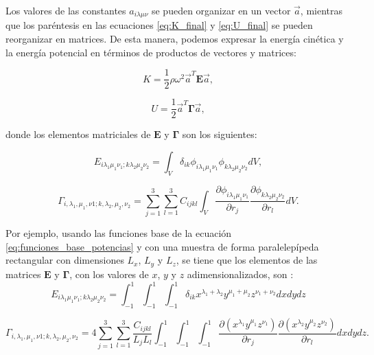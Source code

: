 \documentclass[12pt]{article}
\begin{document}
Los valores de las constantes $a_{i \lambda \mu \nu}$ se pueden organizar en un vector $\vec{a}$, mientras que los paréntesis en las ecuaciones \ref{eq:K_final} y \ref{eq:U_final} se pueden reorganizar en matrices. De esta manera, podemos expresar la energía cinética y la energía potencial en términos de productos de vectores y matrices: 

\begin{equation}
	K = \frac{1}{2} \rho \omega^2 \vec{a}^{T}\bm{E}\vec{a},
	\label{eq:K_matrix}
\end{equation}

\begin{equation}
	U = \frac{1}{2} \vec{a}^{T}\bm{\Gamma}\vec{a},
\end{equation}

donde los elementos matriciales de $\bm{E}$ y $\bm{\Gamma}$ son los siguientes:

\begin{equation}
	E_{i \lambda_1 \mu_1 \nu_1; k \lambda_2 \mu_2 \nu_2} = \int_{V}{\delta_{ik} \phi_{i \lambda_1 \mu_1 \nu_1}  \phi_{k \lambda_2 \mu_2 \nu_2} dV},
	\label{eq:matriz_E}
\end{equation}

\begin{equation}
    \Gamma_{i, \lambda_1, \mu_1,  \nu1; k, \lambda_2, \mu_2, \nu_2} = \sum_{j=1}^{3} \sum_{l=1}^{3} {C_{ijkl} \int_{V}{\frac{\partial \phi_{i \lambda_{1} \mu_1 \nu_1}}{\partial r_j} \frac{\partial \phi_{k \lambda_2 \mu_2 \nu_2}}{\partial r_l} dV}}.
	\label{eq:matriz_gamma}
\end{equation}

Por ejemplo, usando las funciones base de la ecuación \ref{eq:funciones_base_potencias} y con una muestra de forma paralelepípeda rectangular con dimensiones $L_x$, $L_y$ y $L_z$, se tiene que los elementos de las matrices $\bm{E}$ y $\bm{\Gamma}$, con los valores de $x$, $y$ y $z$ adimensionalizados, son \cite{Ohno}:
\begin{equation}
	E_{i \lambda_1 \mu_1 \nu_1; k \lambda_2 \mu_2 \nu_2} = \int_{-1}^{1} \int_{-1}^{1} \int_{-1}^{1} {\delta_{ik} x^{\lambda_1 + \lambda_2} y^{\mu_1 + \mu_2} z^{\nu_1 + \nu_2} dx dy dz}
	\label{eq:matriz_E_paralelepípedo_pot}
\end{equation}

\begin{equation}
    \Gamma_{i, \lambda_1, \mu_1,  \nu1; k, \lambda_2, \mu_2, \nu_2} = 4\sum_{j=1}^{3} \sum_{l=1}^{3} \frac{C_{ijkl}}{L_j L_l} \int_{-1}^{1} \int_{-1}^{1} \int_{-1}^{1} {\frac{\partial (x^{\lambda_1} y^{\mu_1} z^{\nu_1})}{\partial r_j} \frac{\partial (x^{\lambda_2} y^{\mu_2} z^{\nu_2})}{\partial r_l} dx dy dz}.
	\label{eq:matriz_gamma_paralelepípedo_pot}
\end{equation}
\end{document}
